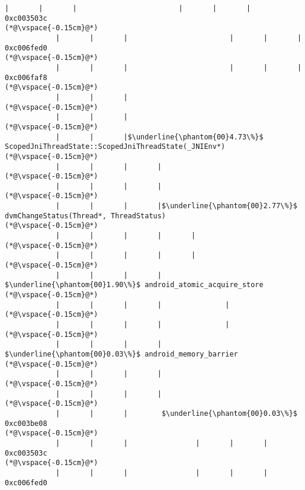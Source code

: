\begin{lstlisting}[caption=Unicode-merkkijonon osoitinoperaatio, label=profile:C2JReadUnicode-512, numberbychapter=true, frame=lines, float, floatplacement=t]
            |       |       |                        |       |       |                       0xc003503c
(*@\vspace{-0.15cm}@*)
            |       |       |                        |       |       |                       0xc006fed0
(*@\vspace{-0.15cm}@*)
            |       |       |                        |       |       |                       0xc006faf8
(*@\vspace{-0.15cm}@*)
            |       |       |
(*@\vspace{-0.15cm}@*)
            |       |       |
(*@\vspace{-0.15cm}@*)
            |       |       |$\underline{\phantom{00}4.73\%}$ ScopedJniThreadState::ScopedJniThreadState(_JNIEnv*)
(*@\vspace{-0.15cm}@*)
            |       |       |       |
(*@\vspace{-0.15cm}@*)
            |       |       |       |
(*@\vspace{-0.15cm}@*)
            |       |       |       |$\underline{\phantom{00}2.77\%}$ dvmChangeStatus(Thread*, ThreadStatus)
(*@\vspace{-0.15cm}@*)
            |       |       |       |       |
(*@\vspace{-0.15cm}@*)
            |       |       |       |       |
(*@\vspace{-0.15cm}@*)
            |       |       |       |        $\underline{\phantom{00}1.90\%}$ android_atomic_acquire_store
(*@\vspace{-0.15cm}@*)
            |       |       |       |               |
(*@\vspace{-0.15cm}@*)
            |       |       |       |               |
(*@\vspace{-0.15cm}@*)
            |       |       |       |                $\underline{\phantom{00}0.03\%}$ android_memory_barrier
(*@\vspace{-0.15cm}@*)
            |       |       |       |
(*@\vspace{-0.15cm}@*)
            |       |       |       |
(*@\vspace{-0.15cm}@*)
            |       |       |        $\underline{\phantom{00}0.03\%}$ 0xc003be08
(*@\vspace{-0.15cm}@*)
            |       |       |                |       |       |               0xc003503c
(*@\vspace{-0.15cm}@*)
            |       |       |                |       |       |               0xc006fed0

\end{lstlisting}
